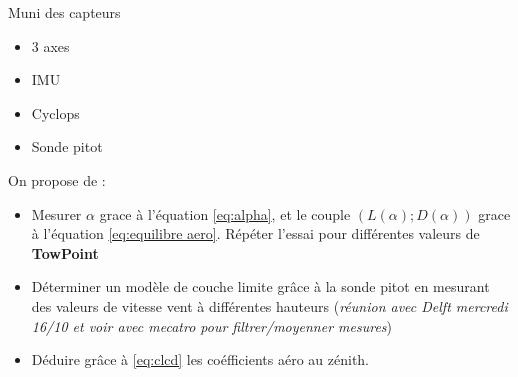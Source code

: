 Muni des capteurs
\begin{itemize}
    \item 3 axes
    \item IMU
    \item Cyclops
    \item Sonde pitot\\
\end{itemize} 

On propose de :
\begin{itemize}
    \item Mesurer $\alpha$ grace à l'équation \ref{eq:alpha}, et le couple $(L(\alpha);D(\alpha))$ grace à l'équation \ref{eq:equilibre aero}. Répéter l'essai pour différentes valeurs de \textbf{TowPoint}
    \item Déterminer un modèle de couche limite grâce à la sonde pitot en mesurant des valeurs de vitesse vent à différentes hauteurs (\textit{réunion avec Delft mercredi 16/10 et voir avec mecatro pour filtrer/moyenner mesures})
    \item Déduire grâce à \ref{eq:clcd} les coéfficients aéro au zénith.
\end{itemize} 